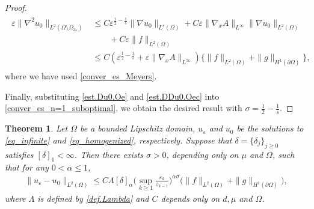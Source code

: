 \documentclass[reqno,12pt]{amsart} %
\newtheorem{theorem}{Theorem}[section]
\theoremstyle{definition}
\theoremstyle{remark}
\numberwithin{equation}{section}
\newcommand{\e}{\varepsilon}
\begin{document}
\begin{proof}
\begin{align}
    \begin{aligned} \label{est.DDu0.Oec}
        \varepsilon\|\nabla^2 u_0\|_{L^2(\Omega\setminus \Omega_{3\varepsilon})}&\leq C\varepsilon^{\frac{1}{2}-\frac{1}{s}}\|\nabla u_0\|_{L^{s}(\Omega)}+C\varepsilon\|\nabla_xA\|_{L^\infty}\|\nabla u_0\|_{L^2(\Omega)}\\&\qquad+C\varepsilon\|f\|_{L^2(\Omega)}\\&\leq C(\varepsilon^{\frac{1}{2}-\frac{1}{s}}+\varepsilon\|\nabla_xA\|_{L^\infty})\big\{\|f\|_{L^2(\Omega)}+\|g\|_{H^1(\partial\Omega)}\big\},
    \end{aligned}
    \end{align}
        where we have used \eqref{conver_es_Meyers}. 

        Finally, substituting \eqref{est.Du0.Oe} and \eqref{est.DDu0.Oec} into \eqref{conver_es_n=1_suboptimal}, we obtain the desired result with $\sigma=\frac{1}{2}-\frac{1}{s}$. 
\end{proof}

\begin{theorem}\label{conver_thm_rate_suboptimal}
Let $\Omega$ be a bounded Lipschitz domain, $u_\varepsilon$ and $u_0$ be the solutions to \eqref{eq_infinite} and \eqref{eq_homogenized}, respectively.
Suppose that $\delta = \{\delta_j\}_{j\geq 0}$ satisfies $[\delta]_1<\infty$.  Then there exists $\sigma>0$, depending only on $\mu$ and $\Omega$, such that for any $0<\alpha\leq 1$,
  \begin{align}\label{conver_es_sub_rate}
    \|u_\varepsilon-u_0\|_{L^2(\Omega)}\leq C\Lambda [\delta]_\alpha \bigg( \sup_{k\geq 1} \frac{\e_k}{\e_{k-1}} \bigg)^{\alpha\sigma} \Big(\|f\|_{L^2(\Omega)}+\|g\|_{H^1(\partial\Omega)}\Big),
  \end{align}
  where $\Lambda$ is defined by \eqref{def.Lambda} and $C$ depends only on $d, \mu$ and $\Omega$.
\end{theorem}
\end{document}
